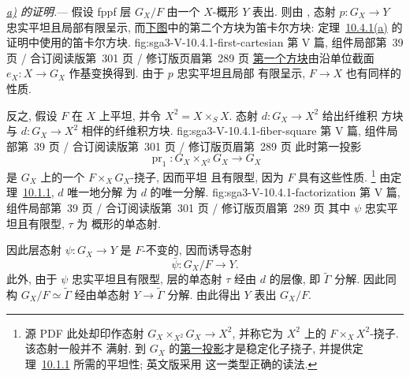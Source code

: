 
\medskip
{}\label{proof:sga3-V-10.4.1-a}%
\noindent\textit{\hyperref[thm:sga3-V-10.4.1-a]{a)} 的证明.}---
假设 fppf 层 \(G_X/F\) 由一个 \(X\)-概形
\(Y\) 表出. 则由 , 态射
\(p:G_X\to Y\) 忠实平坦且局部有限呈示,
而\hyperref[fig:sga3-V-10.4.1-first-cartesian]{下图}中的第二个方块为笛卡尔方块:
  {定理~\hyperref[thm:sga3-V-10.4.1-a]{10.4.1(a)}
   的证明中使用的笛卡尔方块.}
  {fig:sga3-V-10.4.1-first-cartesian}
  {第 V 篇, 组件局部第~39 页 / 合订阅读版第~301 页 /
   修订版页眉第~289 页}
\hyperref[fig:sga3-V-10.4.1-first-cartesian]{第一个方块}由沿单位截面
\(e_X:X\to G_X\) 作基变换得到. 由于 \(p\) 忠实平坦且局部
有限呈示, \(F\to X\) 也有同样的性质.

反之, 假设 \(F\) 在 \(X\) 上平坦, 并令
\(X^2=X\times_SX\). 态射 \(d:G_X\to X^2\) 给出纤维积
方块
  {与 \(d:G_X\to X^2\) 相伴的纤维积方块.}
  {fig:sga3-V-10.4.1-fiber-square}
  {第 V 篇, 组件局部第~39 页 / 合订阅读版第~301 页 /
   修订版页眉第~289 页}
\label{eq:sga3-V-10.4.1-pr1-torsor}%
此时第一投影
\[
  \operatorname{pr}_1:G_X\times_{X^2}G_X\longrightarrow G_X
\]
是 \(G_X\) 上的一个 \(F\times_XG_X\)-挠子, 因而平坦
且有限型, 因为 \(F\) 具有这些性质.%
\footnote{\label{source-note:sga3-V-10.4.1-pr1-torsor}源 PDF 此处却印作态射
\(G_X\times_{X^2}G_X\to X^2\), 并称它为
\(X^2\) 上的 \(F\times_XX^2\)-挠子. 该态射一般并不
满射. 到 \(G_X\) 的\hyperref[eq:sga3-V-10.4.1-pr1-torsor]{第一投影}才是稳定化子挠子,
并提供定理~\hyperref[thm:sga3-V-10.1.1]{10.1.1} 所需的平坦性; 英文版采用
这一类型正确的读法.}
由定理~\hyperref[thm:sga3-V-10.1.1]{10.1.1}, \(d\) 唯一地分解
为
  {\(d\) 的唯一分解.}
  {fig:sga3-V-10.4.1-factorization}
  {第 V 篇, 组件局部第~39 页 / 合订阅读版第~301 页 /
   修订版页眉第~289 页}
其中 \(\psi\) 忠实平坦且有限型, \(\tau\) 为
概形的单态射.

因此层态射 \(\psi:G_X\to Y\) 是
\(F\)-不变的, 因而诱导态射
\[
  \bar\psi:G_X/F\longrightarrow Y.
\]
此外, 由于 \(\psi\) 忠实平坦且有限型,
层的单态射 \(\tau\) 经由 \(d\) 的层像,
即 \(\widetilde\Gamma\) 分解. 因此同构
\(G_X/F\simeq\widetilde\Gamma\) 经由单态射
\(Y\to\widetilde\Gamma\) 分解. 由此得出 \(Y\) 表出 \(G_X/F\).

